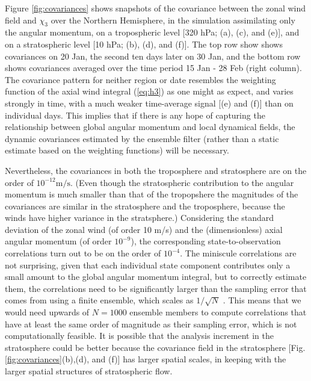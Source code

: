 Figure \ref{fig:covariances} shows snapshots of the covariance between the zonal wind field and $\chi_3$ over the Northern Hemisphere, in the simulation assimilating only the angular momentum, on a tropospheric level [320 hPa; (a), (c), and (e)], and on a stratospheric level [10 hPa; (b), (d), and (f)].
The top row show shows covariances on 20 Jan, the second ten days later on 30 Jan, and the bottom row shows covariances averaged over the time period 15 Jan - 28 Feb (right column).
The covariance pattern for neither region or date resembles the weighting function of the axial wind integral (\ref{eq:h3}) as one might as expect, 
and varies strongly in time, with a much weaker time-average signal [(e) and (f)] than on individual days. 
This implies that if there is any hope of capturing the relationship between global angular momentum and local dynamical fields, the dynamic covariances estimated by the ensemble filter (rather than a static estimate based on the weighting functions) will be necessary.

Nevertheless, the covariances in both the troposphere and stratosphere are on the order of $10^{-12}\text{m/s}$.  
(Even though the stratospheric contribution to the angular momentum is much smaller than that of the tropopshere \citep{Rosen1985,Zhou2008} 
the magnitudes of the covariances are similar in the stratosphere and the troposphere, because the winds have higher variance in the stratsphere.) 
Considering the standard deviation of the zonal wind (of order 10 m/s) and the (dimensionless) axial angular momentum (of order $10^{-9}$), the corresponding state-to-observation correlations turn out to be on the order of $10^{-4}$. 
The miniscule correlations are not surprising, given that each individual state component contributes only a small amount to the global angular momentum integral, but to 
correctly estimate them, the correlations need to be significantly larger than the sampling error that comes from using a finite ensemble, which 
scales as $1/\sqrt{N}$ \citep{Houtekamer1998}. 
This means that we would need upwards of $N=1000$ ensemble members to compute correlations that have at least the same order of magnitude as their sampling error, which is not computationally feasible. 
It is possible that the analysis increment in the stratosphere could be better because the covariance field in the stratosphere [Fig. \ref{fig:covariances}(b),(d), and (f)] has larger spatial scales, in keeping with the larger spatial structures of stratospheric flow.

